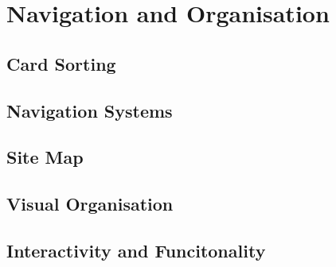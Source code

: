 
\section{Navigation and Organisation}
\subsection{Card Sorting}

\subsection{Navigation Systems}

\subsection{Site Map}

\subsection{Visual Organisation}

\subsection{Interactivity and Funcitonality}

